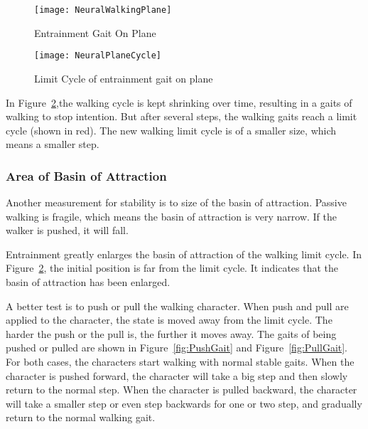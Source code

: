 \begin{figure}[!htbp]
  \begin{center}
     \texttt{[image: NeuralWalkingPlane]}
    \caption{Entrainment Gait On Plane}
    \label{fig:neuralwalkinggait}
\end{center}
\end{figure}

\begin{figure}[!htbp]
  \begin{center}
      \texttt{[image: NeuralPlaneCycle]}
    \caption{Limit Cycle of entrainment gait on plane}
    \label{fig:entrainmentLimitCycleOnPlane}
\end{center}
\end{figure}

In Figure~\ref{fig:entrainmentLimitCycleOnPlane},the walking cycle is kept shrinking over time, resulting in a gaits of walking to stop intention. 
But after several steps, the walking gaits reach a limit cycle (shown in red). 
The new walking limit cycle is of a smaller size, which means a smaller step.


\subsubsection*{Area of Basin of Attraction}
Another measurement for stability is to size of the basin of attraction.
Passive walking is fragile, which means the basin of attraction is very narrow.
If the walker is pushed, it will fall.

Entrainment greatly enlarges the basin of attraction of the walking limit cycle.
In Figure~\ref{fig:entrainmentLimitCycleOnPlane}, the initial position is far from the limit cycle.
It indicates that the basin of attraction has been enlarged.

A better test is to push or pull the walking character.
When push and pull are applied to the character, the state is moved away from the limit cycle.
The harder the push or the pull is, the further it moves away.
The gaits of  being pushed or pulled are shown in Figure~\ref{fig:PushGait} and Figure~\ref{fig:PullGait}.
For both cases, the characters start walking with normal stable gaits.
When the character is pushed forward, the character will take a big step and then slowly return to the normal step.
When the character is pulled backward, the character will take a smaller step or even step backwards for one or two step, and  gradually return to the normal walking gait.


